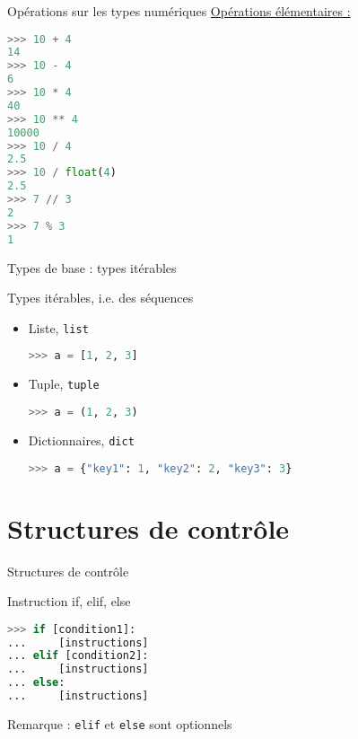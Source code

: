 \begin{frame}[fragile]{Opérations sur les types numériques}
    \underline{Opérations élémentaires :}
    \medskip
\begin{lstlisting}[language=Python, morekeywords={as, TypeError}, numbers=none]
>>> 10 + 4
14
>>> 10 - 4
6
>>> 10 * 4
40
>>> 10 ** 4
10000
>>> 10 / 4
2.5
>>> 10 / float(4)
2.5
>>> 7 // 3
2
>>> 7 % 3
1
\end{lstlisting}
\end{frame}
  
  
\begin{frame}[fragile]{Types de base : types itérables}
  
  \begin{block}{Types itérables, i.e. des séquences}
    \begin{itemize}
      \item Liste, \texttt{list}
\begin{lstlisting}[language=Python, morekeywords={as, TypeError}, numbers=none]
>>> a = [1, 2, 3]
\end{lstlisting}
      \item Tuple, \texttt{tuple}
\begin{lstlisting}[language=Python, morekeywords={as, TypeError}, numbers=none]
>>> a = (1, 2, 3)
\end{lstlisting}
      \item Dictionnaires, \texttt{dict}
\begin{lstlisting}[language=Python, morekeywords={as, TypeError}, numbers=none]
>>> a = {"key1": 1, "key2": 2, "key3": 3}
\end{lstlisting}
    \end{itemize}
  \end{block}
\end{frame}


\section{Structures de contrôle}

\begin{frame}[fragile]{Structures de contrôle}
  \begin{block}{Instruction if, elif, else}
  \medskip  
\begin{lstlisting}[language=Python, morekeywords={True, false}, numbers=none]
>>> if [condition1]:
...     [instructions]
... elif [condition2]:
...     [instructions]
... else:
...     [instructions]
\end{lstlisting}

  \end{block}

  Remarque : \texttt{elif} et \texttt{else} sont optionnels
\end{frame}

